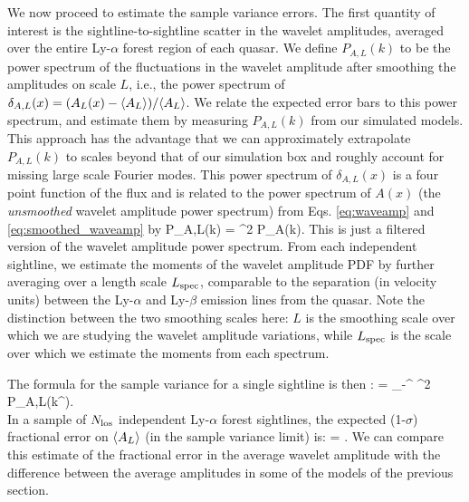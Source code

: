 We now proceed to estimate the sample variance errors.
The first quantity of interest is the sightline-to-sightline scatter in the wavelet amplitudes, averaged over the entire Ly-$\alpha$ forest
region of each quasar. We define $P_{A,L}(k)$ to be the power spectrum of the fluctuations in the wavelet amplitude after smoothing
the amplitudes on scale $L$, i.e., the power spectrum
of $\delta_{A,L}(x) = (A_L(x) - \langle A_L \rangle)/\langle A_L \rangle$. We relate the expected error bars to this power spectrum, and estimate them
by measuring $P_{A,L}(k)$ from our simulated models. This approach has the advantage that we can approximately extrapolate
$P_{A,L}(k)$ to scales beyond that of our simulation box and roughly account for missing large scale Fourier modes.
This power spectrum of $\delta_{A,L}(x)$ is a four point function of the flux and is related
to the power spectrum of $A(x)$ (the {\em unsmoothed} wavelet amplitude power spectrum) from Eqs. \ref{eq:waveamp} and
\ref{eq:smoothed_waveamp} by
 \beqa
P_{A,L}(k) = ^2 P_A(k).
\label{eq:power_filt}
\eeqa
This is just a filtered version of the wavelet amplitude power spectrum. From each independent sightline, we estimate the
moments of the wavelet amplitude PDF by further averaging over a length scale $L_{\rm spec}$, comparable to the separation
(in velocity units) between the Ly-$\alpha$ and Ly-$\beta$ emission lines from the quasar. Note the distinction between the
two smoothing scales here: $L$ is the smoothing scale over which we are studying the wavelet amplitude variations, while
$L_{\rm spec}$ is the scale over which we estimate the moments from each spectrum.

The formula for the sample variance for a single sightline is then \citep{Lidz:2009ca}:
\beqa
{} = \int_{-\infty}^{\infty}  ^2 P_{A,L}(k^\prime). \nonumber \\
\label{eq:var_al}
\eeqa
In a sample of $N_{\rm los}$ independent Ly-$\alpha$ forest sightlines, the expected (1-$\sigma$) fractional error on $\langle A_L \rangle$ (in the sample variance limit) is:
\beqa
  =  .
\label{eq:err_mean}
\eeqa
We can compare this estimate of the fractional error in the average wavelet amplitude with the difference between the average
amplitudes in some of the models of the previous section.

